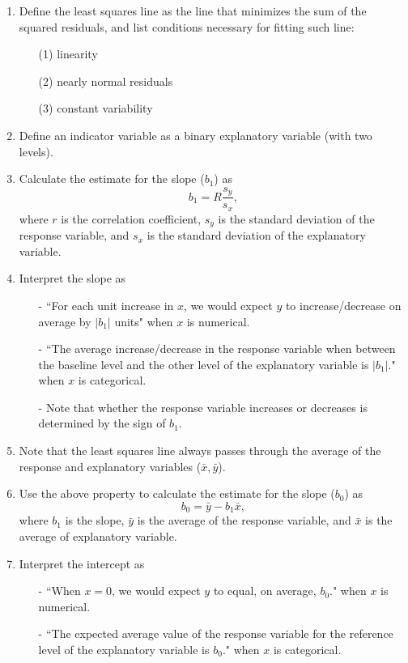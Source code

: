 \documentclass[11pt]{article}
\begin{document}
%
\begin{enumerate}[resume]
\renewcommand\labelenumi{\textcolor{light}{\textbf{LO \theenumi.}}}

\item Define the least squares line as the line that minimizes the sum of the squared residuals, and list conditions necessary for fitting such line:
\begin{enumerate}
\item[(1)] linearity
\item[(2)] nearly normal residuals
\item[(3)] constant variability
\end{enumerate}

\item Define an indicator variable as a binary explanatory variable (with two levels).

\item Calculate the estimate for the slope ($b_1$) as 
\[ b_1 = R\frac{s_y}{s_x}, \]
where $r$ is the correlation coefficient, $s_y$ is the standard deviation of the response variable, and $s_x$ is the standard deviation of the explanatory variable.

\item Interpret the slope as 
\begin{itemize}
\item[-] ``For each unit increase in $x$, we would expect $y$ to increase/decrease on average by $|b_1|$ units" when $x$ is numerical.
\item[-] ``The average increase/decrease in the response variable when between the baseline level and the other level of the explanatory variable is $|b_1|$." when $x$ is categorical.
\item[-] Note that whether the response variable increases or decreases is determined by the sign of $b_1$.
\end{itemize}

\item Note that the least squares line always passes through the average of the response and explanatory variables ($\bar{x},\bar{y}$).

\item Use the above property to calculate the estimate for the slope ($b_0$) as 
\[ b_0 = \bar{y} - b_1 \bar{x}, \]
where $b_1$ is the slope, $\bar{y}$ is the average of the response variable, and $\bar{x}$ is the average of explanatory variable.

\item Interpret the intercept as
\begin{itemize}
\item[-] ``When $x = 0$, we would expect $y$ to equal, on average, $b_0$." when $x$ is numerical.
\item[-] ``The expected average value of the response variable for the reference level of the explanatory variable is $b_0$." when $x$ is categorical.
\end{itemize}


\end{enumerate}
\end{document}
